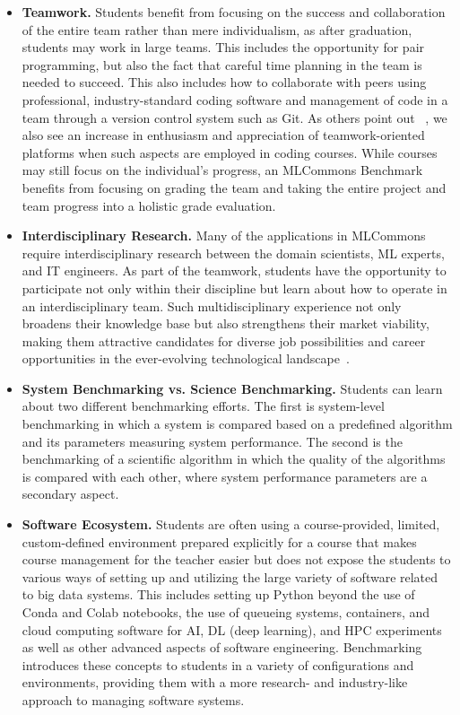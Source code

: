 \documentclass[utf8]{FrontiersinVancouver} %
\begin{document}
\begin{itemize}


\item {\bf Teamwork.} Students benefit from focusing on the success and collaboration of the entire team rather than mere individualism, as after graduation, students may work in large teams. This includes the opportunity for pair programming, but also the fact that careful time planning in the team is needed to succeed. This also includes how to collaborate with peers using professional, industry-standard coding software and management of code in a team through a version control system such as Git. As others point out ~\cite{raibulet}, we also see an increase in enthusiasm and appreciation of teamwork-oriented platforms when such aspects are employed in coding courses. While courses may still focus on the individual's progress, an MLCommons Benchmark benefits from focusing on grading the team and taking the entire project and team progress into a holistic grade evaluation. 

\item {\bf Interdisciplinary Research.} Many of the applications in MLCommons require interdisciplinary research between the domain scientists, ML experts, and IT engineers. As part of the teamwork, students have the opportunity to participate not only within their discipline but learn about how to operate in an interdisciplinary team. Such multidisciplinary experience not only broadens their knowledge base but also strengthens their market viability, making them attractive candidates for diverse job possibilities and career opportunities in the ever-evolving technological landscape~\cite{zeidmane}.

\item {\bf System Benchmarking vs. Science Benchmarking.} Students can learn about two different benchmarking efforts. The first is system-level benchmarking in which a system is compared based on a predefined algorithm and its parameters measuring system performance. The second is the benchmarking of a scientific algorithm in which the quality of the algorithms is compared with each other, where system performance parameters are a secondary aspect.

\item {\bf Software Ecosystem.} Students are often using a course-provided, limited, custom-defined environment prepared explicitly for a course that makes course management for the teacher easier but does not expose the students to various ways of setting up and utilizing the large variety of software related to big data systems. This includes setting up Python beyond the use of Conda and Colab notebooks, the use of queueing systems, containers, and cloud computing software for AI, DL (deep learning), and HPC experiments as well as other advanced aspects of software engineering. Benchmarking introduces these concepts to students in a variety of configurations and environments, providing them with a more research- and industry-like approach to managing software systems.


\end{itemize}
\end{document}
